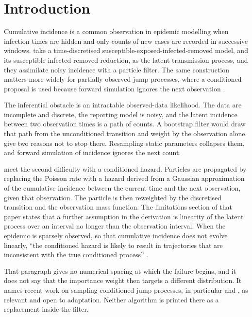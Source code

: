 \section{Introduction}
\label{sec:introduction}

Cumulative incidence is a common observation in epidemic modelling when infection times are hidden and only counts of new cases are recorded in successive windows. \citet{whitaker2025} take a time-discretised susceptible-exposed-infected-removed model, and its susceptible-infected-removed reduction, as the latent transmission process, and they assimilate noisy incidence with a particle filter. The same construction matters more widely for partially observed jump processes, where a conditioned proposal is used because forward simulation ignores the next observation \citep{golightly2015,golightly2019}.

The inferential obstacle is an intractable observed-data likelihood. The data are incomplete and discrete, the reporting model is noisy, and the latent incidence between two observation times is a path of counts. A bootstrap filter would draw that path from the unconditioned transition and weight by the observation alone. \citet[p.~8]{whitaker2025} give two reasons not to stop there. Resampling static parameters collapses them, and forward simulation of incidence ignores the next count.

\citet{whitaker2025} meet the second difficulty with a conditioned hazard. Particles are propagated by replacing the Poisson rate with a hazard derived from a Gaussian approximation of the cumulative incidence between the current time and the next observation, given that observation. The particle is then reweighted by the discretised transition and the observation mass function. The limitations section of that paper states that a further assumption in the derivation is linearity of the latent process over an interval no longer than the observation interval. When the epidemic is sparsely observed, so that cumulative incidence does not evolve linearly, ``the conditioned hazard is likely to result in trajectories that are inconsistent with the true conditioned process'' \citep[p.~25]{whitaker2025}.

That paragraph gives no numerical spacing at which the failure begins, and it does not say that the importance weight then targets a different distribution. It names recent work on sampling conditioned jump processes, in particular \citet{golightly2019} and \citet{corstanje2023}, as relevant and open to adaptation. Neither algorithm is printed there as a replacement inside the filter.

